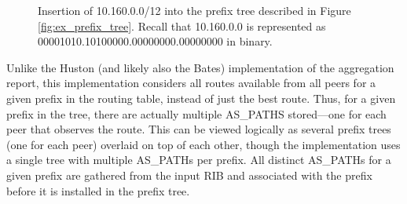 \begin{figure}
    \caption[Insertion of a prefix into the prefix tree]{Insertion of
    10.160.0.0/12 into the prefix tree described in Figure
    \ref{fig:ex_prefix_tree}. Recall that 10.160.0.0 is represented as
    00001010.10100000.00000000.00000000 in binary.}
    \label{fig:ex_prefix_tree_insert}
\end{figure}

Unlike the Huston (and likely also the Bates) implementation of the aggregation
report, this implementation considers all routes available from all peers for a
given prefix in the routing table, instead of just the best route. Thus, for a
given prefix in the tree, there are actually multiple AS\_PATHS stored---one
for each peer that observes the route. This can be viewed logically as several
prefix trees (one for each peer) overlaid on top of each other, though the
implementation uses a single tree with multiple AS\_PATHs per prefix. All
distinct AS\_PATHs for a given prefix are gathered from the input RIB and
associated with the prefix before it is installed in the prefix tree.

